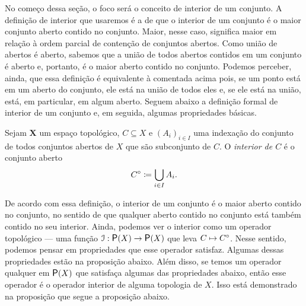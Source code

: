 	No começo dessa seção, o foco será o conceito de interior de um conjunto. A definição de interior que usaremos é a de que o interior de um conjunto é o maior conjunto aberto contido no conjunto. Maior, nesse caso, significa maior em relação à ordem parcial de contenção de conjuntos abertos. Como união de abertos é aberto, sabemos que a união de todos abertos contidos em um conjunto é aberto e, portanto, é o maior aberto contido no conjunto. Podemos perceber, ainda, que essa definição é equivalente à comentada acima pois, se um ponto está em um aberto do conjunto, ele está na união de todos eles e, se ele está na união, está, em particular, em algum aberto. Seguem abaixo a definição formal de interior de um conjunto e, em seguida, algumas propriedades básicas.

\begin{definition}
	Sejam $\bm X$ um espaço topológico, $C \subseteq X$ e $(A_i)_{i \in I}$ uma indexação do conjunto de todos conjuntos abertos de $X$ que são subconjunto de $C$. O \emph{interior de $C$} é o conjunto aberto
	\begin{equation*}
	{C}^\circ \coloneqq \bigcup_{i \in I} A_i.
	\end{equation*}
\end{definition}

	De acordo com essa definição, o interior de um conjunto é o maior aberto contido no conjunto, no sentido de que qualquer aberto contido no conjunto está também contido no seu interior. Ainda, podemos ver o interior como um operador topológico \---- uma função $\mathcal I: \p(X) \to \p(X)$ que leva $C \mapsto {C}^\circ$. Nesse sentido, podemos pensar em propriedades que esse operador satisfaz. Algumas dessas propriedades estão na proposição abaixo. Além disso, se temos um operador qualquer em $\p(X)$ que satisfaça algumas das propriedades abaixo, então esse operador é o operador interior de alguma topologia de $X$. Isso está demonstrado na proposição que segue a proposição abaixo.

